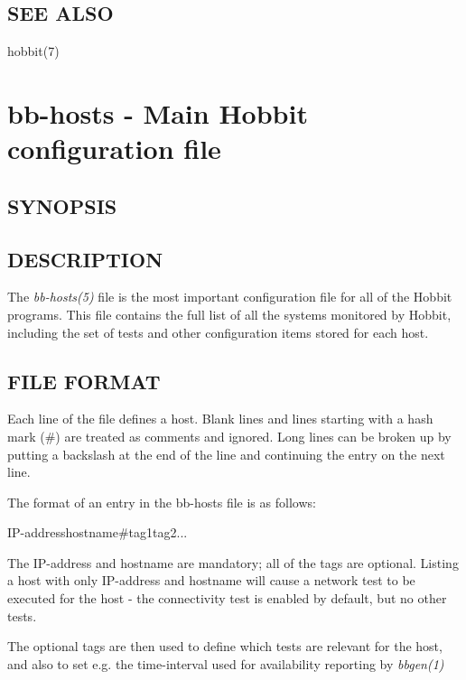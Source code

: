  
\subsection{SEE ALSO}
hobbit(7) 

%
\section{bb-hosts - Main Hobbit configuration file}
 
\subsection{SYNOPSIS}
\begin{description}
\item[]


\end{description}
\subsection{DESCRIPTION}
 The \emph{bb-hosts(5)}
 file is the most important configuration file for all of the Hobbit
 programs. This file contains the full list of all the systems
 monitored by Hobbit, including the set of tests and other
 configuration items stored for each host. 
 
\subsection{FILE FORMAT}
 Each line of the file defines a host. Blank lines and lines starting
 with a hash mark (\#) are treated as comments and ignored. Long lines
 can be broken up by putting a backslash at the end of the line and
 continuing the entry on the next line. 


  The format of an entry in the bb-hosts file is as follows:  
 
IP-addresshostname\#tag1tag2... 


  The IP-address and hostname are mandatory; all of the tags are
  optional. Listing a host with only IP-address and hostname will
  cause a network test to be executed for the host - the connectivity
  test is enabled by default, but no other tests. 



  The optional tags are then used to define which tests are relevant
  for the host, and also to set e.g. the time-interval used for
  availability reporting by \emph{bbgen(1)}





